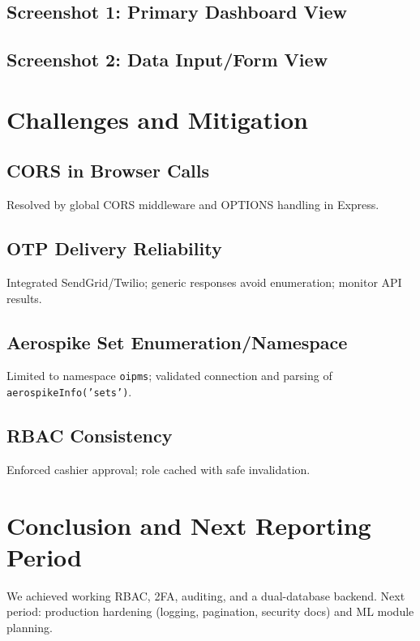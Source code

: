 \documentclass[12pt]{article}
\begin{document}
\subsection{Screenshot 1: Primary Dashboard View}
\subsection{Screenshot 2: Data Input/Form View}

\section{Challenges and Mitigation}
\subsection{CORS in Browser Calls}
Resolved by global CORS middleware and OPTIONS handling in Express.

\subsection{OTP Delivery Reliability}
Integrated SendGrid/Twilio; generic responses avoid enumeration; monitor API results.

\subsection{Aerospike Set Enumeration/Namespace}
Limited to namespace \texttt{oipms}; validated connection and parsing of \texttt{aerospikeInfo('sets')}.

\subsection{RBAC Consistency}
Enforced cashier approval; role cached with safe invalidation.

\section{Conclusion and Next Reporting Period}
We achieved working RBAC, 2FA, auditing, and a dual-database backend. Next period: production hardening (logging, pagination, security docs) and ML module planning.
\end{document}
